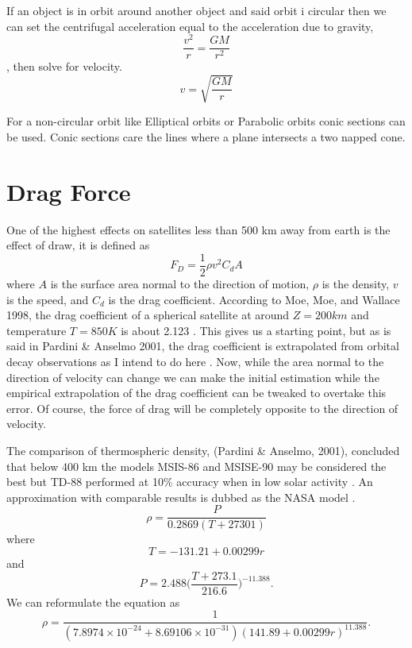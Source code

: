 \documentclass{article}
\begin{document}
If an object is in orbit around another object and said orbit i circular then we can set the centrifugal acceleration equal to the acceleration due to gravity, $$\frac{v^2}{r}=\frac{GM}{r^2}$$, then solve for velocity.
\begin{equation}
v=\sqrt{\frac{GM}{r}}
\end{equation}

For a non-circular orbit like Elliptical orbits or Parabolic orbits conic sections can be used. Conic sections care the lines where a plane intersects a two napped cone.

\section{Drag Force}

One of the highest effects on satellites less than 500 km away from earth is the effect of draw, it is defined as $$F_D=\frac{1}{2}\rho v^2 C_d A$$ where $A$ is the surface area normal to the direction of motion, $\rho$ is the density, $v$ is the speed, and $C_d$ is the drag coefficient. According to Moe, Moe, and Wallace 1998, the drag coefficient of a spherical satellite at around $Z=200km$ and temperature $T=850K$ is about 2.123 \cite{moe_moe_wallace_1998}. This gives us a starting point, but as is said in Pardini \& Anselmo 2001, the drag coefficient is extrapolated from orbital decay observations as I intend to do here \cite{pardini_anselmo_2001}. Now, while the area normal to the direction of velocity can change we can make the initial estimation while the empirical extrapolation of the drag coefficient can be tweaked to overtake this error. Of course, the force of drag will be completely opposite to the direction of velocity.

The comparison of thermospheric density, (Pardini \& Anselmo, 2001), concluded that below 400 km the models MSIS-86 and MSISE-90 may be considered the best but TD-88 performed at 10\% accuracy when in low solar activity \cite{pardini_anselmo_2001}. An approximation with comparable results is dubbed as the NASA model \cite{brito_celestino_moraes_2015}\cite{nasa}.
\begin{equation}
\rho=\frac{P}{0.2869(T+27301)}
\end{equation} where $$T=-131.21+0.00299r$$ and $$P=2.488\bigg(\frac{T+273.1}{216.6}\bigg)^{-11.388}.$$
We can reformulate the equation as 
\begin{equation}
\rho=\frac{1}{(7.8974\times10^{-24}+8.69106\times10^{-31})(141.89+0.00299r)^{11.388}}.
\end{equation}
\end{document}
